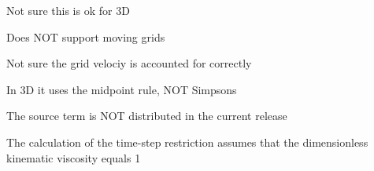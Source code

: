 \begin{DoxyRefList}
%
Not sure this is ok for 3D  
\item[Subprogram \mbox{\hyperlink{matspl_v_i_i_8_f_ac2728f9a64e014026c02a5826fef01ca}{Mat\+Split\+V\+II}} (I\+E\+L\+EM, N\+D\+IM, N\+O\+R\+D\+ER, V\+E\+CN, Jacobian\+Matrix, L\+DJ, K\+M\+AT, K\+P\+OS, K\+N\+EG, V\+L\+E\+FT, V\+R\+I\+G\+HT, L\+DA, WR, L\+P\+OS, L\+N\+EG, E\+I\+G\+E\+N\+D\+E\+CO)]\label{bug__bug000002}%
%
Does N\+OT support moving grids  
\item[Subprogram \mbox{\hyperlink{quadrature_8f_ad014778b03d6b519d64b7a38214cba6d}{Q\+U\+A\+D\+R\+A\+T\+U\+RE}} (N\+D\+IM, N\+O\+F\+V\+E\+RT, N\+D\+OF, Z\+R\+OE, X\+Y\+Z\+D\+OT, F\+A\+CN, F\+L\+XN, F\+L\+U\+XF)]\label{bug__bug000010}%
%
Not sure the grid velociy is accounted for correctly  
\item[Subprogram \mbox{\hyperlink{simpson_8f_ab020f1e204629b20d9eb01726d1f3190}{S\+I\+M\+P\+S\+ON}} (N\+D\+IM, N\+O\+F\+V\+E\+RT, N\+D\+OF, Z\+R\+OE, X\+Y\+Z\+D\+OT, F\+A\+CN, F\+L\+XN, F\+L\+U\+XF)]\label{bug__bug000011}%
%
In 3D it uses the midpoint rule, N\+OT Simpson\textquotesingle{}s  
\item[Subprogram \mbox{\hyperlink{_u_c_v_sys__scheme_8_f_ac1d816a6f16d611ef0e874b790903fe2}{U\+C\+V\+S\+Y\+S\+\_\+\+S\+C\+H\+E\+ME}} (M\+A\+T\+R\+I\+X\+S\+P\+L\+I\+T\+T\+ER, W, N\+O\+D\+R\+ES, T\+S\+T\+EP, B\+E\+TA, S\+T\+I\+FC, N\+O\+R\+D\+ER, N\+D\+OF, N\+O\+F\+V\+E\+RT, V\+CN, N\+D\+IM, D\+F\+G\+H\+DU, L\+DJ, C\+E\+L\+R\+ES, S\+O\+U\+R\+CE, I\+E\+L\+EM, M\+A\+T\+R\+I\+X\+\_\+\+A\+S\+S\+E\+M\+B\+LY)]\label{bug__bug000008}%
%
The source term is N\+OT distributed in the current release  
\item[Subprogram \mbox{\hyperlink{vsflx4_8f_a10011952338ce2e78a6acded71132121}{V\+S\+F\+L\+X4}} (I\+E\+L\+EM, Z\+R\+OE, Nod\+Res, T\+S\+T\+EP, N\+O\+F\+V\+AR, V\+CN, N\+D\+IM, N\+O\+F\+V\+E\+RT, V\+O\+L\+U\+ME, S\+T\+I\+FD, V\+I\+S\+CL, V\+I\+S\+CT, M\+A\+T\+R\+I\+X\+\_\+\+A\+S\+S\+E\+M\+B\+LY)]\label{bug__bug000005}%
%
The calculation of the time-\/step restriction assumes that the dimensionless kinematic viscosity equals 1 
\end{DoxyRefList}